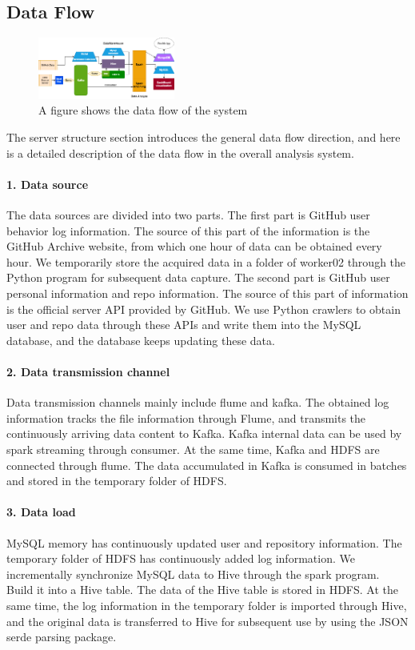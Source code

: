 \subsection{Data Flow}

\begin{figure}[H]
    \centering
    \includegraphics[width=0.4\textwidth]{./pic/dataflow.png}
    \caption{A figure shows the data flow of the system}
    \label{fig:dataflow}
\end{figure}


The server structure section introduces the general data flow direction, and here is a detailed description of the data flow in the overall analysis system.

\paragraph*{1. Data source}
The data sources are divided into two parts.
The first part is GitHub user behavior log information. The source of this part of the information is the GitHub Archive website, from which one hour of data can be obtained every hour. We temporarily store the acquired data in a folder of worker02 through the Python program for subsequent data capture.
The second part is GitHub user personal information and repo information. The source of this part of information is the official server API provided by GitHub. We use Python crawlers to obtain user and repo data through these APIs and write them into the MySQL database, and the database keeps updating these data.

\paragraph*{2. Data transmission channel}
Data transmission channels mainly include flume and kafka.
The obtained log information tracks the file information through Flume, and transmits the continuously arriving data content to Kafka. Kafka internal data can be used by spark streaming through consumer. At the same time, Kafka and HDFS are connected through flume. The data accumulated in Kafka is consumed in batches and stored in the temporary folder of HDFS.

\paragraph*{3. Data load}
MySQL memory has continuously updated user and repository information. The temporary folder of HDFS has continuously added log information. We incrementally synchronize MySQL data to Hive through the spark program. Build it into a Hive table. The data of the Hive table is stored in HDFS.
At the same time, the log information in the temporary folder is imported through Hive, and the original data is transferred to Hive for subsequent use by using the JSON serde parsing package.

